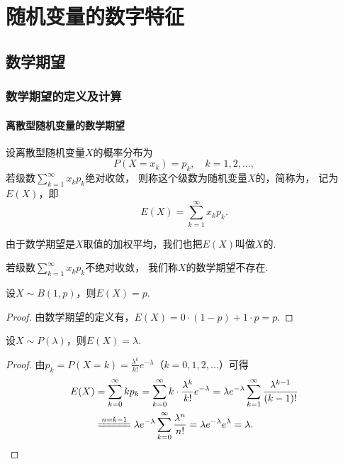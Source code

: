 \chapter{随机变量的数字特征}
\section{数学期望}
\subsection{数学期望的定义及计算}
\subsubsection{离散型随机变量的数学期望}
\begin{definition}
设离散型随机变量\(X\)的概率分布为\[
P(X=x_k) = p_k, \quad k=1,2,\dotsc,
\]若级数\(\sum\limits_{k=1}^\infty {x_k p_k}\)绝对收敛，%
则称这个级数为随机变量\(X\)的，简称为，%
记为\(E(X)\)，即\begin{equation}\label{equation:随机变量的数字特征.数学期望的定义式}
E(X) = \sum\limits_{k=1}^\infty x_k p_k.
\end{equation}

由于数学期望是\(X\)取值的加权平均，我们也把\(E(X)\)叫做\(X\)的.

若级数\(\sum\limits_{k=1}^\infty x_k p_k\)不绝对收敛，%
我们称\(X\)的数学期望不存在.
\end{definition}

\begin{theorem}\label{theorem:随机变量的数字特征.0-1分布的数学期望}
设\(X \sim B(1,p)\)，则\(E(X) = p\).
\begin{proof}
由数学期望的定义有，\(E(X) = 0 \cdot (1-p) + 1 \cdot p = p\).
\end{proof}
\end{theorem}

\begin{theorem}\label{theorem:随机变量的数字特征.泊松分布的数学期望}
设\(X \sim P(\lambda)\)，则\(E(X) = \lambda\).
\begin{proof}
由\(p_k = P(X=k) = \frac{\lambda^k}{k!} e^{-\lambda}\)（\(k=0,1,2,\dotsc\)）可得
\begin{align*}
E(X) &= \sum\limits_{k=0}^\infty {k p_k}
= \sum\limits_{k=0}^\infty {k \cdot \frac{\lambda^k}{k!} e^{-\lambda}}
= \lambda e^{-\lambda} \sum\limits_{k=1}^\infty {\frac{\lambda^{k-1}}{(k-1)!}} \\
&\xlongequal{n=k-1} \lambda e^{-\lambda} \sum\limits_{k=0}^\infty {\frac{\lambda^{n}}{n!}}
= \lambda e^{-\lambda} e^{\lambda} = \lambda.
\qedhere
\end{align*}
\end{proof}
\end{theorem}

